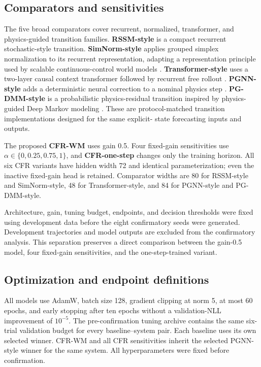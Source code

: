 \documentclass[pdflatex,sn-basic]{sn-jnl}
\newcommand{\method}{CFR-WM}
\begin{document}
\subsection{Comparators and sensitivities}

The five broad comparators cover recurrent, normalized, transformer, and
physics-guided transition families. \textbf{RSSM-style} is a compact recurrent
stochastic-style transition. \textbf{SimNorm-style} applies grouped simplex
normalization to its recurrent representation, adapting a representation
principle used by scalable continuous-control world models
\citep{hansen2023_td_mpc2_scalable_robust_world}. \textbf{Transformer-style} uses a
two-layer causal context transformer followed by recurrent free rollout
\citep{micheli2022_transformers_are_sample_efficient_world}. \textbf{PGNN-style}
adds a deterministic neural correction to a nominal physics step
\citep{robinson2022_physics_guided_neural_networks_for}. \textbf{PG-DMM-style} is a
probabilistic physics-residual transition inspired by physics-guided Deep
Markov modeling \citep{liu2022_physics_guided_deep_markov_models}. These are
protocol-matched transition implementations designed for the same explicit-
state forecasting inputs and outputs.

The proposed \textbf{\method} uses gain 0.5. Four fixed-gain sensitivities use
$\alpha\in\{0,0.25,0.75,1\}$, and \textbf{CFR-one-step} changes only the
training horizon. All six CFR variants have hidden width 72 and identical
parameterization; even the inactive fixed-gain head is retained. Comparator
widths are 80 for RSSM-style and SimNorm-style, 48 for Transformer-style, and
84 for PGNN-style and PG-DMM-style.

Architecture, gain, tuning budget, endpoints, and decision thresholds were
fixed using development data before the eight confirmatory seeds were
generated. Development trajectories and model outputs are excluded from the
confirmatory analysis. This separation preserves a direct comparison between
the gain-0.5 model, four fixed-gain sensitivities, and the one-step-trained
variant.

\subsection{Optimization and endpoint definitions}

All models use AdamW, batch size 128, gradient clipping at norm 5, at most 60
epochs, and early stopping after ten epochs without a validation-NLL
improvement of $10^{-5}$. The pre-confirmation tuning archive contains the same
six-trial validation budget for every baseline--system pair. Each baseline uses
its own selected winner. CFR-WM and all CFR sensitivities inherit the selected PGNN-style
winner for the same system. All hyperparameters were fixed before confirmation.
\end{document}
